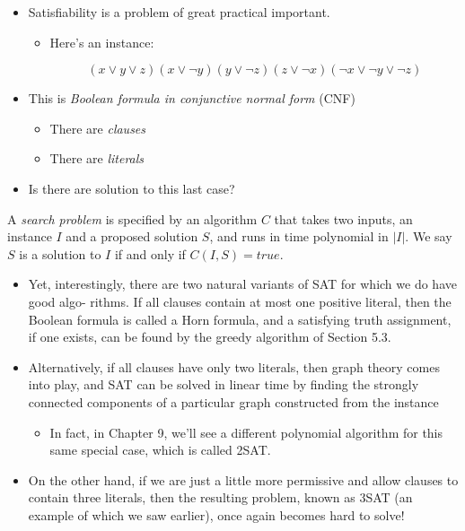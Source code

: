 \documentclass[a4paper,11pt]{article}
\begin{document}
\begin{itemize}
\itemsep1pt\parskip0pt
\item
  Satisfiability is a problem of great practical important.

  \begin{itemize}
  \item
    Here's an instance:

    \[(x \lor y \lor z)(x \lor \lnot y)(y \lor \lnot z)(z \lor \lnot x)(\lnot x \lor \lnot y \lor \lnot z)\]
  \end{itemize}
\item
  This is \emph{Boolean formula in conjunctive normal form} (CNF)

  \begin{itemize}
  \itemsep1pt\parskip0pt
  \item
    There are \emph{clauses}
  \item
    There are \emph{literals}
  \end{itemize}
\item
  Is there are solution to this last case?
\end{itemize}

\begin{description}
\itemsep1pt\parskip0pt
\item[Search problem]
A \emph{search problem} is specified by an algorithm $C$ that takes two
inputs, an instance $I$ and a proposed solution $S$, and runs in time
polynomial in $|I|$. We say $S$ is a solution to $I$ if and only if
$C(I, S) = true$.
\end{description}

\begin{itemize}
\item
  Yet, interestingly, there are two natural variants of SAT for which we
  do have good algo- rithms. If all clauses contain at most one positive
  literal, then the Boolean formula is called a Horn formula, and a
  satisfying truth assignment, if one exists, can be found by the greedy
  algorithm of Section 5.3.
\item
  Alternatively, if all clauses have only two literals, then graph
  theory comes into play, and SAT can be solved in linear time by
  finding the strongly connected components of a particular graph
  constructed from the instance

  \begin{itemize}
  \itemsep1pt\parskip0pt
  \item
    In fact, in Chapter 9, we'll see a different polynomial algorithm
    for this same special case, which is called 2SAT.
  \end{itemize}
\item
  On the other hand, if we are just a little more permissive and allow
  clauses to contain three literals, then the resulting problem, known
  as 3SAT (an example of which we saw earlier), once again becomes hard
  to solve!
\end{itemize}
\end{document}
